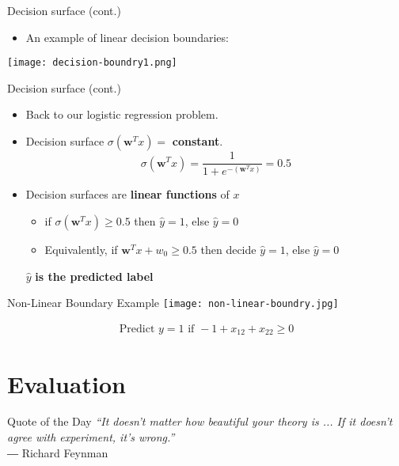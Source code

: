 \documentclass[serif, aspectratio=169]{beamer}
\begin{document}
\begin{frame}{Decision surface (cont.)}
    \begin{itemize}
        \item An example of linear decision boundaries:
    \end{itemize}
    \begin{center}
        \texttt{[image: decision-boundry1.png]}
    \end{center}
\end{frame}

\begin{frame}{Decision surface (cont.)}
    \begin{itemize}
      \item Back to our logistic regression problem.
      \item Decision surface $\sigma (\mathbf{w}^Tx) = $ \textbf{constant}.
        \[
            \sigma (\mathbf{w}^Tx) = \frac{1}{1 + e^{-(\mathbf{w}^Tx)}} = 0.5
        \]
      \item Decision surfaces are \textbf{linear functions} of $x$
        \begin{itemize}
            \item if $\sigma (\mathbf{w}^Tx) \geq 0.5$ then $\hat{y}=1$, else $\hat{y} = 0$
            \item Equivalently, if $\mathbf{w}^Tx + w_0 \geq 0.5$ then decide $\hat{y}=1$, else $\hat{y}=0$
        \end{itemize}%
        \vfill
        \begin{center}
            \( \hat{y} \) \textbf{is the predicted label}
        \end{center}
    \end{itemize}
\end{frame}

\begin{frame}{Non-Linear Boundary Example}
    \centering
    \texttt{[image: non-linear-boundry.jpg]}
    
    \begin{align*}
        \text{Predict } y=1 \text{ if } -1 + x_12 + x_22 \geq 0 \end{align*}
\end{frame}

\section{Evaluation}

\begin{frame}{Quote of the Day}
\centering
\textit{“It doesn't matter how beautiful your theory is ... If it doesn't agree with experiment, it's wrong.”} \\[0.5cm]
― Richard Feynman
\end{frame}
\end{document}
